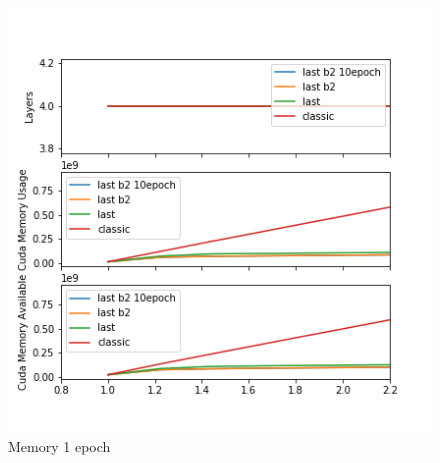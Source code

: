 \begin{figure}[H]
\centering
\includegraphics{parts/appendix/reports-gmsnn/docs_esteban-latex/test_reports/2018-06-12/history_memory_1e.png}
\caption{Memory 1 epoch}
\end{figure}

